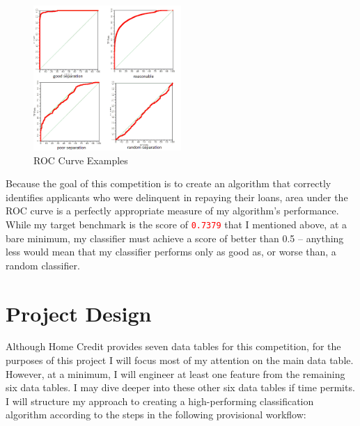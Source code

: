 \documentclass[12pt, letterpaper]{article}
\begin{document}
\begin{figure}[ht]
\includegraphics[width=0.5\textwidth]{roccurves}
\centering
\caption{ROC Curve Examples\cite{mlwikirocanalysis}}
\end{figure}

Because the goal of this competition is to create an algorithm that correctly identifies applicants who were delinquent in repaying their loans, area under the ROC curve is a perfectly appropriate measure of my algorithm's performance. While my target benchmark is the score of \colorbox{backcolor}{\textcolor{red}{\texttt{0.7379}}} that I mentioned above, at a bare minimum, my classifier must achieve a score of better than 0.5 -- anything less would mean that my classifier performs only as good as, or worse than, a random classifier.

\section{Project Design}
Although Home Credit provides seven data tables for this competition, for the purposes of this project I will focus most of my attention on the main data table. However, at a minimum, I will engineer at least one feature from the remaining six data tables. I may dive deeper into these other six data tables if time permits. I will structure my approach to creating a high-performing classification algorithm according to the steps in the following provisional workflow:
\end{document}
